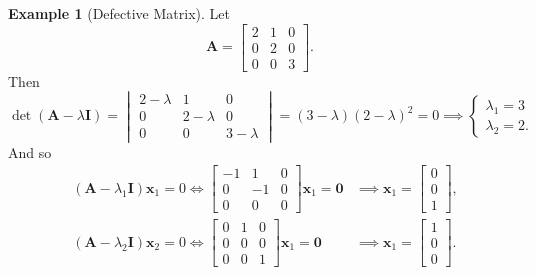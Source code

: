 \documentclass[12pt,openany]{book}
\theoremstyle{definition}
\newtheorem{example}{Example}[chapter]
\begin{document}
	\begin{example}[Defective Matrix]
		Let \[
		\textbf{A}=\begin{bmatrix}
			2&1&0\\0&2&0\\0&0&3
		\end{bmatrix}.
		\] Then \[
		\det(\textbf{A}-\lambda\textbf{I})=\begin{vmatrix}
			2-\lambda&1&0\\0&2-\lambda&0\\0&0&3-\lambda
		\end{vmatrix}=(3-\lambda)(2-\lambda)^2=0\implies\begin{cases}
		\lambda_1=3\\
		\lambda_2=2.
	\end{cases}
		\] And so \begin{align*}
			&(\textbf{A}-\lambda_1\textbf{I})\textbf{x}_1=0\iff\begin{bmatrix}
				-1&1&0\\0&-1&0\\0&0&0
			\end{bmatrix}\textbf{x}_1=\textbf{0}&\implies\textbf{x}_1=\begin{bmatrix}
			0\\0\\1
		\end{bmatrix},\\
		&(\textbf{A}-\lambda_2\textbf{I})\textbf{x}_2=0\iff\begin{bmatrix}
			0&1&0\\0&0&0\\0&0&1
		\end{bmatrix}\textbf{x}_1=\textbf{0}&\implies\textbf{x}_1=\begin{bmatrix}
			1\\0\\0
		\end{bmatrix}.
		\end{align*}
	\end{example}
	\vspace{4pt}
\end{document}
